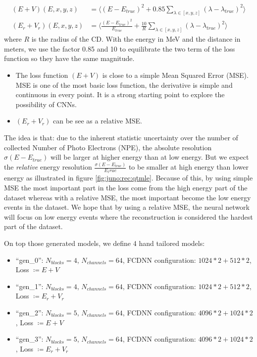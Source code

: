 \begin{align}
  (E+V)(E, x, y, z) &= \bigg\langle (E - E_{true})^2 + 0.85 \sum_{\lambda \in [x, y, z]} (\lambda - \lambda_{true})^2 \bigg\rangle \\
  (E_r + V_r)(E, x, y, z) &=  \bigg\langle \frac{(E - E_{true}) ^ 2}{E_{true}} + \frac{10}{R} \sum_{\lambda \in [x, y, z]} (\lambda - \lambda_{true})^2 \bigg\rangle
\end{align}
where $R$ is the radius of the CD. With the energy in MeV and the distance in meters, we use the factor 0.85 and 10 to equilibrate the two term of the loss function so they have the same magnitude.
\begin{itemize}
  \item The loss function $(E+V)$ is close to a simple Mean Squared Error (MSE). MSE is one of the most basic loss function, the derivative is simple and continuous in every point. It is a strong starting point to explore the possibility of CNNs.
  \item $(E_r + V_r)$ can be see as a relative MSE.
\end{itemize}
The idea is that: due to the inherent statistic uncertainty over the number of collected Number of Photo Electrons (NPE), the absolute resolution $\sigma (E - E_{true})$ will be larger at higher energy than at low energy. But we expect the \textit{relative} energy resolution $\frac{\sigma(E - E_{true})}{E_true}$ to be smaller at high energy than lower energy as illustrated in figure \ref{fig:juno:rec:qtmle}. Because of this, by using simple MSE the most important part in the loss come from the high energy part of the dataset whereas with a relative MSE, the most important become the low energy events in the dataset. We hope that by using a relative MSE, the neural network will focus on low energy events where the reconstruction is considered the hardest part of the dataset.


On top those generated models, we define 4 hand tailored models:
\begin{itemize}
  \item ``gen\_0'': $N_{blocks} = 4$, $N_{channels} = 64$, FCDNN configuration: $1024 * 2 + 512 * 2$, Loss $\coloneq E+V$
  \item ``gen\_1'': $N_{blocks} = 4$, $N_{channels} = 64$, FCDNN configuration: $1024 * 2 + 512 * 2$, Loss $\coloneq E_r+V_r$
  \item ``gen\_2'': $N_{blocks} = 5$, $N_{channels} = 64$, FCDNN configuration: $4096 * 2 + 1024 * 2$, Loss $\coloneq E+V$
  \item ``gen\_3'': $N_{blocks} = 5$, $N_{channels} = 64$, FCDNN configuration: $4096 * 2 + 1024 * 2$, Loss $\coloneq E_r+V_r$
\end{itemize}

